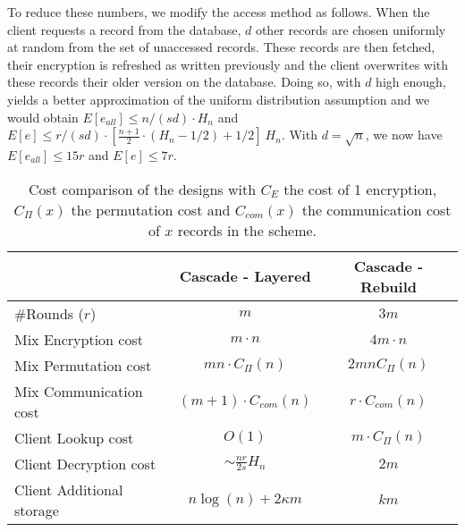 \documentclass{llncs}
\begin{document}
To reduce these numbers, we modify the access method as follows. When the client requests a record from the database, $d$ other records are chosen uniformly at random from the set of unaccessed records. These records are then fetched, their encryption is refreshed as written previously and the client overwrites with these records their older version on the database. Doing so, with $d$ high enough, yields a better approximation of the uniform distribution assumption and we would obtain  $E[e_{all}]\leq n/(sd) \cdot H_n $ and $E[e] \leq {r/(sd)} \cdot \left [ \frac{n+1}{2}\cdot(H_n-1/2)+1/2 \right ] \ H_n$.
With $d=\sqrt n$, we now have $E[e_{all}]\leq 15 r$ and $E[e]\leq 7r$.


\begin{table*}
\centering
\begin{tabular}{l *2c}
\toprule
    					& Cascade - Layered	 			& Cascade - Rebuild						\\
\midrule
\#Rounds ($r$) & $m$ & $3m$ \\
Mix Encryption cost & $m \cdot  n$ & $4m  \cdot  n$  \\
Mix Permutation cost & $m n \cdot C_{\Pi}(n)$ & $2 m n C_{\Pi}(n)$ \\
Mix Communication cost & $(m+1) \cdot C_{com}(n)$ & $r \cdot C_{com}(n)$\\
Client Lookup cost & $O(1)$ & $m\cdot C_{\Pi}(n)$ \\
Client Decryption cost & $\sim \frac{nr}{2s} H_n$ & $2m$ \\
Client Additional storage & $n\log(n)+ 2 \kappa m$ & $km$ \\
\bottomrule
\end{tabular}
\centering
\caption{Cost comparison of the designs with $C_{E}$ the cost of 1 encryption, $C_{\Pi}(x)$ the permutation cost and $C_{com}(x)$ the communication cost of $x$ records in the scheme.}
\end{table*}
\end{document}
